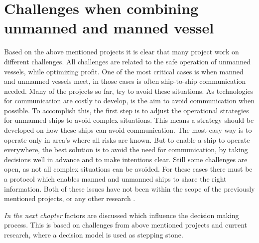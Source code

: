 \section{Challenges when combining unmanned and manned vessel}
\label{sec:challenges-future}
Based on the above mentioned projects it is clear that many project work on different challenges. All challenges are related to the safe operation of unmanned vessels, while optimizing profit. One of the most critical cases is when manned and unmanned vessels meet, in those cases is often ship-to-ship communication needed. Many of the projects so far, try to avoid these situations. As technologies for communication are costly to develop, is the aim to avoid communication when possible. To accomplish this, the first step is to adjust the operational strategies for unmanned ships to avoid complex situations. This means a strategy should be developed on how these ships can avoid communication. The most easy way is to operate only in area's where all risks are known. But to enable a ship to operate everywhere, the best solution is to avoid the need for communication, by taking decisions well in advance and to make intentions clear. Still some challenges are open, as not all complex situations can be avoided. For these cases there must be a protocol which enables manned and unmanned ships to share the right information. Both of these issues have not been within the scope of the previously mentioned projects, or any other research \cite{Kooij2018}. 

\vspace{1.5cm}
\emph{In the next chapter} factors are discussed which influence the decision making process. This is based on challenges from above mentioned projects and current research, where a decision model is used as stepping stone.
















